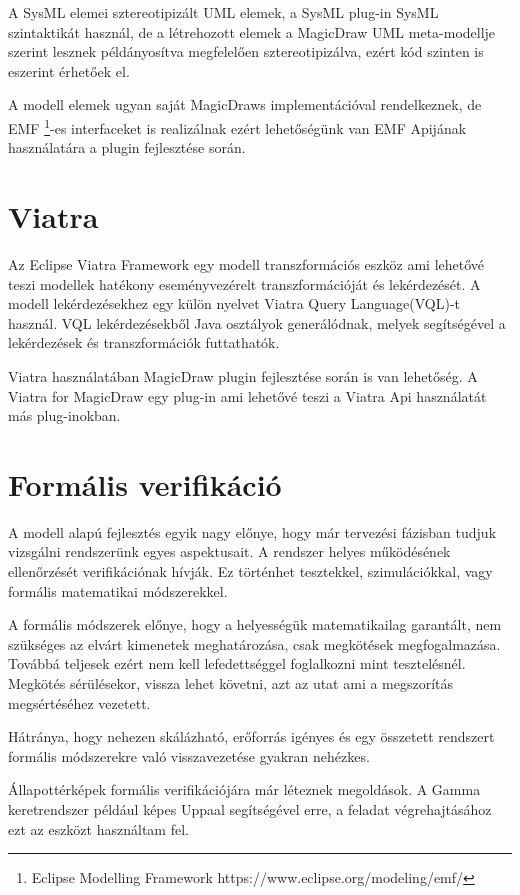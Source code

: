 A SysML elemei sztereotipizált UML elemek, a SysML plug-in SysML szintaktikát használ, de a létrehozott elemek a MagicDraw UML meta-modellje szerint lesznek példányosítva megfelelően sztereotipizálva, ezért kód szinten is eszerint érhetőek el.

A modell elemek ugyan saját MagicDraws implementációval rendelkeznek, de EMF \footnote{Eclipse Modelling Framework https://www.eclipse.org/modeling/emf/}-es interfaceket is realizálnak ezért lehetőségünk van EMF Apijának használatára a plugin fejlesztése során.

\section{Viatra}

Az Eclipse Viatra Framework egy modell transzformációs eszköz ami lehetővé teszi modellek hatékony eseményvezérelt transzformációját és lekérdezését. A modell lekérdezésekhez egy külön nyelvet Viatra Query Language(VQL)-t használ. VQL lekérdezésekből Java osztályok generálódnak, melyek segítségével a lekérdezések és transzformációk futtathatók.

Viatra használatában MagicDraw plugin fejlesztése során is van lehetőség. A Viatra for MagicDraw egy plug-in ami lehetővé teszi a Viatra Api használatát más plug-inokban. 

\section{Formális verifikáció}

A modell alapú fejlesztés egyik nagy előnye, hogy már tervezési fázisban tudjuk vizsgálni rendszerünk egyes aspektusait. A rendszer helyes működésének ellenőrzését verifikációnak hívják. Ez történhet tesztekkel, szimulációkkal, vagy formális matematikai módszerekkel.

A formális módszerek előnye, hogy a helyességük matematikailag garantált, nem szükséges az elvárt kimenetek meghatározása, csak megkötések megfogalmazása. Továbbá teljesek ezért nem kell lefedettséggel foglalkozni mint tesztelésnél. Megkötés sérülésekor, vissza lehet követni, azt az utat ami a megszorítás megsértéséhez vezetett.

Hátránya, hogy nehezen skálázható, erőforrás igényes és egy összetett rendszert formális módszerekre való visszavezetése gyakran nehézkes.

Állapottérképek formális verifikációjára már léteznek megoldások. A Gamma keretrendszer például képes Uppaal segítségével erre, a feladat végrehajtásához ezt az eszközt használtam fel.

